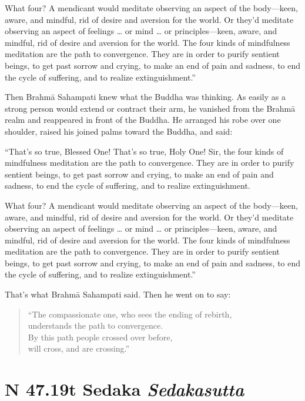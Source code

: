 \documentclass[12pt,openany]{book}%
\newcommand*{\suttatitleacronym}[1]{\smaller[2]{#1}\vspace*{.3em}}
\newcommand*{\suttatitletranslation}[1]{\linebreak{#1}}
\newcommand*{\suttatitleroot}[1]{\linebreak\smaller[2]\itshape{#1}}
\newcommand*{\tocacronym}[1]{\hspace*{-3.3em}{#1}\quad}
\newcommand*{\toctranslation}[1]{#1}
\newcommand*{\tocroot}[1]{(\textit{#1})}
\begin{document}
What four? A mendicant would meditate observing an aspect of the body—keen, aware, and mindful, rid of desire and aversion for the world. Or they’d meditate observing an aspect of feelings … or mind … or principles—keen, aware, and mindful, rid of desire and aversion for the world. The four kinds of mindfulness meditation are the path to convergence. They are in order to purify sentient beings, to get past sorrow and crying, to make an end of pain and sadness, to end the cycle of suffering, and to realize extinguishment.” 

Then \textsanskrit{Brahmā} Sahampati knew what the Buddha was thinking. As easily as a strong person would extend or contract their arm, he vanished from the \textsanskrit{Brahmā} realm and reappeared in front of the Buddha. He arranged his robe over one shoulder, raised his joined palms toward the Buddha, and said: 

“That’s so true, Blessed One! That’s so true, Holy One! Sir, the four kinds of mindfulness meditation are the path to convergence. They are in order to purify sentient beings, to get past sorrow and crying, to make an end of pain and sadness, to end the cycle of suffering, and to realize extinguishment. 

What four? A mendicant would meditate observing an aspect of the body—keen, aware, and mindful, rid of desire and aversion for the world. Or they’d meditate observing an aspect of feelings … or mind … or principles—keen, aware, and mindful, rid of desire and aversion for the world. The four kinds of mindfulness meditation are the path to convergence. They are in order to purify sentient beings, to get past sorrow and crying, to make an end of pain and sadness, to end the cycle of suffering, and to realize extinguishment.” 

That’s what \textsanskrit{Brahmā} Sahampati said. Then he went on to say: 

\begin{verse}%
“The compassionate one, who sees the ending of rebirth, \\
understands the path to convergence. \\
By this path people crossed over before, \\
will cross, and are crossing.” 

%
\end{verse}

%
\section*{{\suttatitleacronym SN 47.19}{\suttatitletranslation At Sedaka }{\suttatitleroot Sedakasutta}}
\addcontentsline{toc}{section}{\tocacronym{SN 47.19} \toctranslation{At Sedaka } \tocroot{Sedakasutta}}
\end{document}
